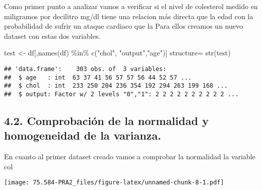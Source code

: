 \documentclass[
]{article}
\newenvironment{Shaded}{\begin{snugshade}}{\end{snugshade}}
\newcommand{\AttributeTok}[1]{\textcolor[rgb]{0.80,0.80,0.80}{#1}}
\newcommand{\DecValTok}[1]{\textcolor[rgb]{0.86,0.86,0.80}{#1}}
\newcommand{\FunctionTok}[1]{\textcolor[rgb]{0.94,0.94,0.56}{#1}}
\newcommand{\NormalTok}[1]{\textcolor[rgb]{0.80,0.80,0.80}{#1}}
\newcommand{\OtherTok}[1]{\textcolor[rgb]{0.94,0.94,0.56}{#1}}
\newcommand{\SpecialCharTok}[1]{\textcolor[rgb]{0.86,0.64,0.64}{#1}}
\newcommand{\StringTok}[1]{\textcolor[rgb]{0.80,0.58,0.58}{#1}}
\begin{document}
Como primer punto a analizar vamos a verificar si el nivel de colesterol
medido en miligramos por decilitro mg/dl tiene una relacion más directa
que la edad con la probabilidad de sufrir un ataque cardiaco que la Para
ellos creamos un nuevo dataset con estas dos variables.

\begin{Shaded}
\begin{Highlighting}[]
\NormalTok{test }\OtherTok{\textless{}{-}}\NormalTok{ df[,}\FunctionTok{names}\NormalTok{(df) }\SpecialCharTok{\%in\%} \FunctionTok{c}\NormalTok{(}\StringTok{"chol"}\NormalTok{, }\StringTok{"output"}\NormalTok{,}\StringTok{"age"}\NormalTok{)]}
\NormalTok{structure}\OtherTok{=} \FunctionTok{str}\NormalTok{(test)}
\end{Highlighting}
\end{Shaded}

\begin{verbatim}
## 'data.frame':    303 obs. of  3 variables:
##  $ age   : int  63 37 41 56 57 57 56 44 52 57 ...
##  $ chol  : int  233 250 204 236 354 192 294 263 199 168 ...
##  $ output: Factor w/ 2 levels "0","1": 2 2 2 2 2 2 2 2 2 2 ...
\end{verbatim}

\hypertarget{comprobaciuxf3n-de-la-normalidad-y-homogeneidad-de-la-varianza.}{%
\subsection{4.2. Comprobación de la normalidad y homogeneidad de la
varianza.}\label{comprobaciuxf3n-de-la-normalidad-y-homogeneidad-de-la-varianza.}}

En cuanto al primer dataset creado vamos a comprobar la normalidad la
variable col

\begin{Shaded}
\end{Shaded}

\texttt{[image: 75.584-PRA2\_files/figure-latex/unnamed-chunk-8-1.pdf]}

\begin{Shaded}
\end{Shaded}
\end{document}
